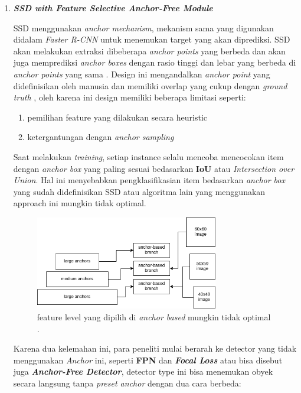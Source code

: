 \documentclass[a4paper]{article}
\begin{document}
\begin{enumerate}

    \item \textbf{\textit{SSD with Feature Selective Anchor-Free Module}}

    SSD menggunakan \textit{anchor mechanism}, mekanism sama yang digunakan didalam \textit{Faster R-CNN} untuk menemukan target yang akan diprediksi. SSD akan melakukan extraksi dibeberapa \textit{anchor points} yang berbeda dan akan juga memprediksi \textit{anchor boxes} dengan rasio tinggi dan lebar yang berbeda di \textit{anchor points} yang sama \autocite{19532655}. Design ini mengandalkan \textit{anchor point} yang didefinisikan oleh manusia dan memiliki overlap yang cukup dengan \textit{ground truth} \autocite{FCOS-1}, oleh karena ini design memiliki beberapa limitasi seperti:
    \begin{enumerate}
        \item pemilihan feature yang dilakukan secara heuristic
        \item ketergantungan dengan \textit{anchor sampling}
    \end{enumerate}

    Saat melakukan \textit{training}, setiap instance selalu mencoba mencocokan item dengan \textit{anchor box} yang paling sesuai bedasarkan \textbf{IoU} atau \textit{Intersection over Union}. Hal ini menyebabkan pengklasifikasian item bedasarkan \textit{anchor box} yang sudah didefinisikan SSD atau algoritma lain yang menggunakan approach ini mungkin tidak optimal\autocite{Zhu_2019_CVPR}.


    \begin{figure}[h]
        \includegraphics[width=8cm]{general_architectur_anchor_based.png}
        \centering

        \caption{feature level yang dipilih di \textit{anchor based} mungkin tidak optimal \autocite{Zhu_2019_CVPR}.}
    \end{figure}

    
    Karena dua kelemahan ini, para peneliti mulai berarah ke detector yang tidak menggunakan \textit{Anchor} ini, seperti \textbf{FPN} dan \textbf{\textit{Focal Loss}} atau bisa disebut juga \textbf{\textit{Anchor-Free Detector}}\autocite{Zhang_2020_CVPR}, detector type ini bisa menemukan obyek secara langsung tanpa \textit{preset anchor} dengan dua cara berbeda:


\end{enumerate}
\end{document}
